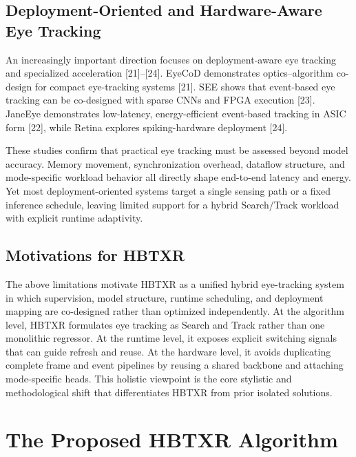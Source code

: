 \documentclass[journal]{IEEEtran}
\begin{document}
\subsection{Deployment-Oriented and Hardware-Aware Eye Tracking}
An increasingly important direction focuses on deployment-aware eye tracking and specialized acceleration [21]--[24]. EyeCoD demonstrates optics--algorithm co-design for compact eye-tracking systems [21]. SEE shows that event-based eye tracking can be co-designed with sparse CNNs and FPGA execution [23]. JaneEye demonstrates low-latency, energy-efficient event-based tracking in ASIC form [22], while Retina explores spiking-hardware deployment [24].

These studies confirm that practical eye tracking must be assessed beyond model accuracy. Memory movement, synchronization overhead, dataflow structure, and mode-specific workload behavior all directly shape end-to-end latency and energy. Yet most deployment-oriented systems target a single sensing path or a fixed inference schedule, leaving limited support for a hybrid Search/Track workload with explicit runtime adaptivity.

\subsection{Motivations for HBTXR}
The above limitations motivate HBTXR as a unified hybrid eye-tracking system in which supervision, model structure, runtime scheduling, and deployment mapping are co-designed rather than optimized independently. At the algorithm level, HBTXR formulates eye tracking as Search and Track rather than one monolithic regressor. At the runtime level, it exposes explicit switching signals that can guide refresh and reuse. At the hardware level, it avoids duplicating complete frame and event pipelines by reusing a shared backbone and attaching mode-specific heads. This holistic viewpoint is the core stylistic and methodological shift that differentiates HBTXR from prior isolated solutions.

\section{The Proposed HBTXR Algorithm}
\end{document}
